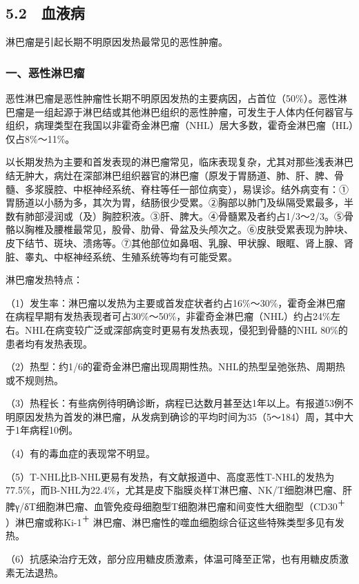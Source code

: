 \protect\hypertarget{text00034.html}{}{}

\subsection{5.2　血液病}

淋巴瘤是引起长期不明原因发热最常见的恶性肿瘤。

\subsubsection{一、恶性淋巴瘤}

恶性淋巴瘤是恶性肿瘤性长期不明原因发热的主要病因，占首位（50\%）。恶性淋巴瘤是一组起源于淋巴结或其他淋巴组织的恶性肿瘤，可发生于人体内任何器官与组织，病理类型在我国以非霍奇金淋巴瘤（NHL）居大多数，霍奇金淋巴瘤（HL）仅占8\%～11\%。

以长期发热为主要和首发表现的淋巴瘤常见，临床表现复杂，尤其对那些浅表淋巴结无肿大，病灶在深部淋巴组织器官的淋巴瘤（原发于胃肠道、肺、肝、脾、骨髓、多浆膜腔、中枢神经系统、脊柱等任一部位病变），易误诊。结外病变有：①胃肠道以小肠为多，其次为胃，结肠很少受累。②胸部以肺门及纵隔受累最多，半数有肺部浸润或（及）胸腔积液。③肝、脾大。④骨髓累及者约占1/3～2/3。⑤骨骼以胸椎及腰椎最常见，股骨、肋骨、骨盆及头颅次之。⑥皮肤受累表现为肿块、皮下结节、斑块、溃疡等。⑦其他部位如鼻咽、乳腺、甲状腺、眼眶、肾上腺、肾脏、睾丸、中枢神经系统、生殖系统等均有可能受累。

淋巴瘤发热特点：

（1）发生率：淋巴瘤以发热为主要或首发症状者约占16\%～30\%，霍奇金淋巴瘤在病程早期有发热表现者可占30\%～50\%，非霍奇金淋巴瘤（NHL）约占24\%左右。NHL在病变较广泛或深部病变时更易有发热表现，侵犯到骨髓的NHL
80\%的患者均有发热表现。

（2）热型：约1/6的霍奇金淋巴瘤出现周期性热。NHL的热型呈弛张热、周期热或不规则热。

（3）热程长：有些病例待明确诊断，病程已达数月甚至达1年以上。有报道53例不明原因发热为首发的淋巴瘤，从发病到确诊的平均时间为35（5～184）周，其中大于1年病程10例。

（4）有的毒血症的表现常不明显。

（5）T-NHL比B-NHL更易有发热，有文献报道中、高度恶性T-NHL的发热为77.5\%，而B-NHL为22.4\%，尤其是皮下脂膜炎样T淋巴瘤、NK/T细胞淋巴瘤、肝脾γ/δT细胞淋巴瘤、血管免疫母细胞型T细胞淋巴瘤和间变性大细胞型（CD30\textsuperscript{＋}
）淋巴瘤或称Ki-1\textsuperscript{＋}
淋巴瘤、淋巴瘤性的噬血细胞综合征这些特殊类型多见有发热。

（6）抗感染治疗无效，部分应用糖皮质激素，体温可降至正常，也有用糖皮质激素无法退热。


